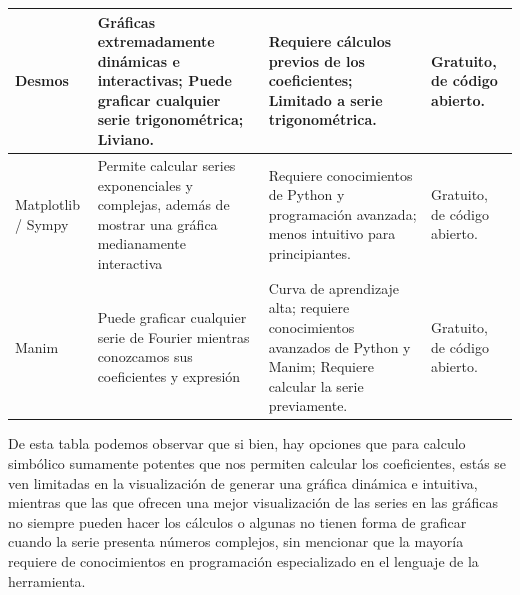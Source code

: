 \begin{longtable}{ | m{2cm} | m{4cm} | m{4cm} | m{3cm} | }
	Desmos & Gráficas extremadamente dinámicas e interactivas; Puede graficar cualquier serie trigonométrica; Liviano. & Requiere cálculos previos de los coeficientes; Limitado a serie trigonométrica. & Gratuito, de código abierto. \\ \hline
	Matplotlib / Sympy & Permite calcular series exponenciales y complejas, además de mostrar una gráfica medianamente interactiva & Requiere conocimientos de Python y programación avanzada; menos intuitivo para principiantes. & Gratuito, de código abierto. \\ \hline
	Manim & Puede graficar cualquier serie de Fourier mientras conozcamos sus coeficientes y expresión & Curva de aprendizaje alta; requiere conocimientos avanzados de Python y Manim; Requiere calcular la serie previamente. & Gratuito, de código abierto. \\ \hline
	
\end{longtable}
 \label{tabla:Comparativa de los sitemas vistos en función de las series de Fourier}
\vspace{0.5cm}

De esta tabla podemos observar que si bien, hay opciones que para calculo simbólico sumamente potentes que nos permiten calcular los coeficientes, estás se ven limitadas en la visualización de generar una gráfica dinámica e intuitiva, mientras que las que ofrecen una mejor visualización de las series en las gráficas no siempre pueden hacer los cálculos o algunas no tienen forma de graficar cuando la serie presenta números complejos, sin mencionar que la mayoría requiere de conocimientos en programación especializado en el lenguaje de la herramienta.



